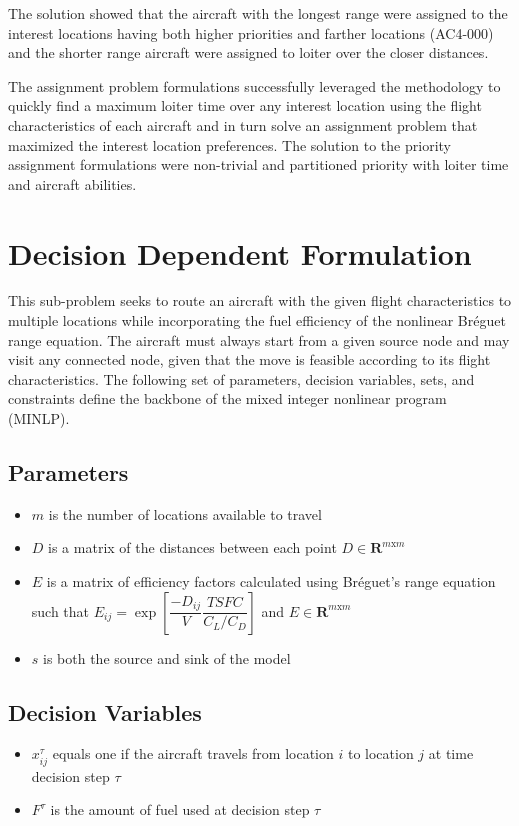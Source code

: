 The solution showed that the aircraft with the longest range were assigned to the interest locations having both higher priorities and farther locations (AC4-000) and the shorter range aircraft were assigned to loiter over the closer distances. \par 
The assignment problem formulations successfully leveraged the methodology to quickly find a maximum loiter time over any interest location using the flight characteristics of each aircraft and in turn solve an assignment problem that maximized the interest location preferences. The solution to the priority assignment formulations were non-trivial and partitioned priority with loiter time and aircraft abilities.

\section{Decision Dependent Formulation}
\label{section:DDF}
This sub-problem seeks to route an aircraft with the given flight characteristics to multiple locations while incorporating the fuel efficiency of the nonlinear Br\'eguet range equation. The aircraft must always start from a given source node and may visit any connected node, given that the move is feasible according to its flight characteristics. The following set of parameters, decision variables, sets, and constraints define the backbone of the mixed integer nonlinear program (MINLP).
\subsection*{Parameters}
\begin{itemize}
    \item $m$ is the number of locations available to travel
    \item $D$ is a matrix of the distances between each point $D\in \mathbf{R}^{m\text{x}m}$
    \item $E$ is a matrix of efficiency factors calculated using Br\'eguet's range equation such that $E_{ij} = \exp\left[\dfrac{-D_{ij}}{V}\dfrac{TSFC}{C_L/C_D}\right]$ and $E\in \mathbf{R}^{m\text{x}m}$
    \item $s$ is both the source and sink of the model
\end{itemize}
\subsection*{Decision Variables}
\begin{itemize}
    \item $x_{ij}^{\tau}$ equals one if the aircraft travels from location $i$ to location $j$ at time decision step $\tau$
    \item $F^{\tau}$ is the amount of fuel used at decision step $\tau$
\end{itemize}
